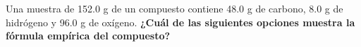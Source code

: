 Una muestra de 152.0 g de un compuesto contiene 48.0 g de carbono, 8.0 g de hidrógeno y 96.0 g de oxígeno.
\textbf{¿Cuál de las siguientes opciones muestra la fórmula empírica del compuesto?}

\begin{choices}
    \choice  {}
    \choice  {}
    \choice  {}
    \choice  {}
\end{choices}